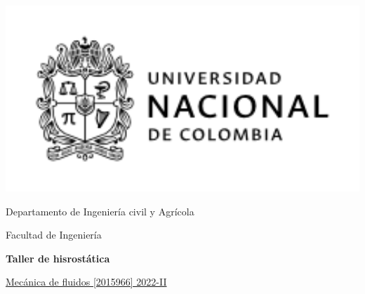 \documentclass[12pt, a4paper]{exam}
\begin{document}
	\noindent
	\begin{minipage}[l]{0.1\textwidth}
		\noindent
		\includegraphics[width=2.8\textwidth]{ESCUDO.png}
	\end{minipage}
\hfill
\begin{minipage}[c]{0.8\textwidth}
	\begin{center}
		{\large  Departamento de Ingeniería civil y Agrícola\par
		\large	Facultad de Ingeniería	\par
    \large \textbf{Taller de hisrost\'atica}	\par
} %
	\end{center}
\end{minipage}
\par
\vspace{0.2in}
\noindent
    \uline{Mecánica de fluidos [2015966]	\hfill 2022-II	}
\par 
\vspace{0.15in}
\noindent
\centering
\end{document}
